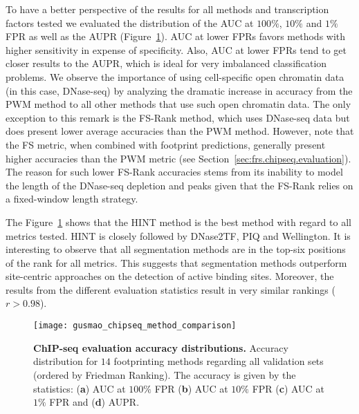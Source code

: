 To have a better perspective of the results for all methods and transcription factors tested we evaluated the distribution of the AUC at $100\%$, $10\%$ and $1\%$ FPR as well as the AUPR (Figure~\ref{fig:gusmao_chipseq_method_comparison}). AUC at lower FPRs favors methods with higher sensitivity in expense of specificity. Also, AUC at lower FPRs tend to get closer results to the AUPR, which is ideal for very imbalanced classification problems. We observe the importance of using cell-specific open chromatin data (in this case, DNase-seq) by analyzing the dramatic increase in accuracy from the PWM method to all other methods that use such open chromatin data. The only exception to this remark is the FS-Rank method, which uses DNase-seq data but does present lower average accuracies than the PWM method. However, note that the FS metric, when combined with footprint predictions, generally present higher accuracies than the PWM metric (see Section~\ref{sec:frs.chipseq.evaluation}). The reason for such lower FS-Rank accuracies stems from its inability to model the length of the DNase-seq depletion and peaks given that the FS-Rank relies on a fixed-window length strategy.

The Figure~\ref{fig:gusmao_chipseq_method_comparison} shows that the HINT method is the best method with regard to all metrics tested. HINT is closely followed by DNase2TF, PIQ and Wellington. It is interesting to observe that all segmentation methods are in the top-six positions of the rank for all metrics. This suggests that segmentation methods outperform site-centric approaches on the detection of active binding sites. Moreover, the results from the different evaluation statistics result in very similar rankings ($r > 0.98$).

\begin{figure}[h!]
\centering
\texttt{[image: gusmao\_chipseq\_method\_comparison]}
\caption[ChIP-seq evaluation accuracy distributions]{\textbf{ChIP-seq evaluation accuracy distributions.} Accuracy distribution for $14$ footprinting methods regarding all validation sets (ordered by Friedman Ranking). The accuracy is given by the statistics: (\textbf{a}) AUC at $100\%$ FPR (\textbf{b}) AUC at $10\%$ FPR (\textbf{c}) AUC at $1\%$ FPR and (\textbf{d}) AUPR.}
\label{fig:gusmao_chipseq_method_comparison}
\end{figure}

